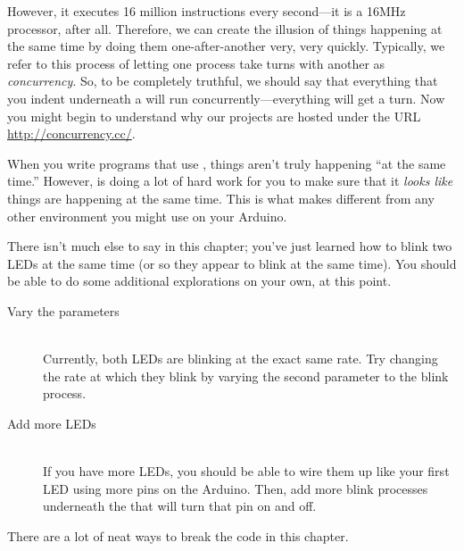 However, it executes 16 million instructions every second---it is a 16MHz processor, after all. Therefore, we can create the illusion of things happening at the same time by doing them one-after-another very, very quickly. Typically, we refer to this process of letting one process take turns with another as {\em concurrency}. So, to be completely truthful, we should say that everything that you indent underneath a \PAR will run concurrently---everything will get a turn. Now you might begin to understand why our projects are hosted under the URL \url{http://concurrency.cc/}.

When you write programs that use \PAR, things aren't truly happening ``at the same time.'' However, \plumbing is doing a lot of hard work for you to make sure that it {\em looks like} things are happening at the same time. This is what makes \plumbing different from any other environment you might use on your Arduino.

\EXPLORATIONS
There isn't much else to say in this chapter; you've just learned how to blink two LEDs at the same time (or so they appear to blink at the same time). You should be able to do some additional explorations on your own, at this point.

\begin{description}
	\item[Vary the parameters]\ \\
	Currently, both LEDs are blinking at the exact same rate. Try changing the rate at which they blink by varying the second parameter to the {\procname blink} process.
	\item[Add more LEDs]\ \\
	If you have more LEDs, you should be able to wire them up like your first LED using more pins on the Arduino. Then, add more {\procname blink} processes underneath the \PAR that will turn that pin on and off.
\end{description}

\BREAKAGE
There are a lot of neat ways to break the code in this chapter.

